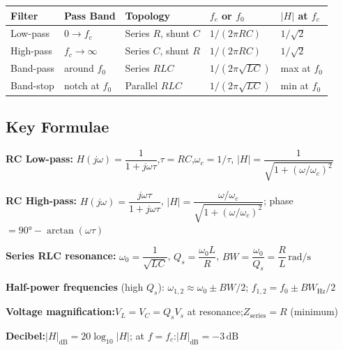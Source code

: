 \documentclass[a4paper, 11pt]{article}
\begin{document}
\begin{center}\renewcommand{\arraystretch}{1.3}
\begin{tabular}{lllll}
\toprule
\textbf{Filter} & \textbf{Pass Band} & \textbf{Topology} & \textbf{$f_c$ or $f_0$} & $|H|$ at $f_c$ \\
\midrule
Low-pass  & $0\to f_c$         & Series $R$, shunt $C$   & $1/(2\pi RC)$          & $1/\sqrt{2}$ \\
High-pass & $f_c\to\infty$     & Series $C$, shunt $R$   & $1/(2\pi RC)$          & $1/\sqrt{2}$ \\
Band-pass & around $f_0$       & Series $RLC$            & $1/(2\pi\sqrt{LC})$    & max at $f_0$ \\
Band-stop & notch at $f_0$     & Parallel $RLC$          & $1/(2\pi\sqrt{LC})$    & min at $f_0$ \\
\bottomrule
\end{tabular}
\end{center}

\subsection{Key Formulae}

\begin{tcolorbox}[enhanced, breakable,
  colback=LightBG, colframe=SlateGray, colbacktitle=SlateGray, coltitle=white,
  fonttitle=\bfseries\sffamily\small, title={\faSquareRootAlt\enspace Key Formulae},
  arc=6pt, boxrule=1.5pt, left=8pt, right=8pt, top=6pt, bottom=6pt]
\textbf{RC Low-pass:}\quad
$H(j\omega)=\dfrac{1}{1+j\omega\tau}$,\quad $\tau=RC$,\quad $\omega_c=1/\tau$,\quad
$|H|=\dfrac{1}{\sqrt{1+(\omega/\omega_c)^2}}$

\smallskip
\textbf{RC High-pass:}\quad
$H(j\omega)=\dfrac{j\omega\tau}{1+j\omega\tau}$,\quad
$|H|=\dfrac{\omega/\omega_c}{\sqrt{1+(\omega/\omega_c)^2}}$;\quad
phase $=90°-\arctan(\omega\tau)$

\smallskip
\textbf{Series RLC resonance:}\quad
$\omega_0=\dfrac{1}{\sqrt{LC}}$,\quad
$Q_s=\dfrac{\omega_0 L}{R}$,\quad
$BW=\dfrac{\omega_0}{Q_s}=\dfrac{R}{L}\,\text{rad/s}$

\smallskip
\textbf{Half-power frequencies} (high $Q_s$):\quad
$\omega_{1,2}\approx\omega_0\pm BW/2$;\quad
$f_{1,2}=f_0\pm BW_{\mathrm{Hz}}/2$

\smallskip
\textbf{Voltage magnification:}\quad $V_L=V_C=Q_s V_s$ at resonance;\quad $Z_{\mathrm{series}}=R$ (minimum)

\smallskip
\textbf{Decibel:}\quad $|H|_{\mathrm{dB}}=20\log_{10}|H|$;\quad
at $f=f_c$:\enspace $|H|_{\mathrm{dB}}=-3\,\text{dB}$
\end{tcolorbox}
\end{document}
